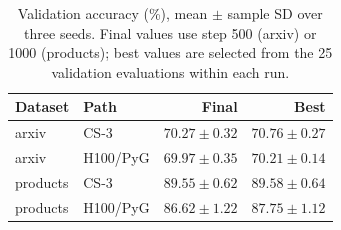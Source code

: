 \begin{table}[t]
  \centering
  \small
  \setlength{\tabcolsep}{4pt}
  \caption{Validation accuracy (\%), mean $\pm$ sample SD over three seeds. Final values use step 500 (arxiv) or 1000 (products); best values are selected from the 25 validation evaluations within each run.}
  \label{tab:accuracy}
  \begin{tabular}{@{}llrr@{}}
    \hline
    Dataset & Path & Final & Best \\
    \hline
    arxiv & CS-3 & $70.27 \pm 0.32$ & $70.76 \pm 0.27$ \\
    arxiv & H100/PyG & $69.97 \pm 0.35$ & $70.21 \pm 0.14$ \\
    products & CS-3 & $89.55 \pm 0.62$ & $89.58 \pm 0.64$ \\
    products & H100/PyG & $86.62 \pm 1.22$ & $87.75 \pm 1.12$ \\
    \hline
  \end{tabular}
\end{table}
